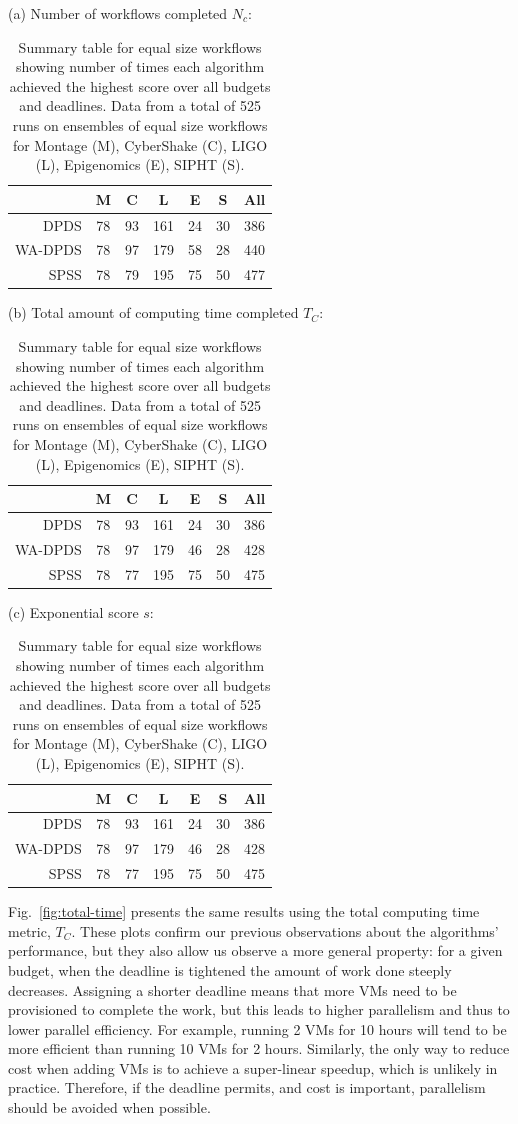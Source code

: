 \documentclass{sig-alternate}
\begin{document}
\begin{table}[tb]
\centering

(a) Number of workflows completed $N_c$:
\medskip
\begin{tabular}{r|cccccc}
 & M & C & L & E & S & All\tabularnewline
\hline
DPDS      &   78 &  93 & 161 &  24  & 30 & 386\tabularnewline
WA-DPDS   &    78  & 97 & 179  & 58  & 28 & 440\tabularnewline
SPSS     &    78  & 79 & 195 &  75 &  50 & 477\tabularnewline
\end{tabular}
\medskip

(b) Total amount of computing time completed $T_C$:
\medskip
\begin{tabular}{r|cccccc}
 & M & C & L & E & S & All\tabularnewline
\hline
DPDS      &   78 &  93 & 161 &  24 &  30 & 386\tabularnewline
WA-DPDS   &    78  & 97 & 179 &  46  & 28 & 428\tabularnewline
SPSS     &    78 &  77 & 195  & 75 &  50 & 475\tabularnewline
\end{tabular}
\medskip

(c) Exponential score $s$:
\medskip
\begin{tabular}{r|cccccc}
 & M & C & L & E & S & All\tabularnewline
\hline
DPDS      &   78  & 93 & 161 &  24 &  30 & 386\tabularnewline
WA-DPDS   &    78 &  97 & 179  & 46  & 28 & 428\tabularnewline
SPSS     &    78 &  77 & 195 &  75  & 50 & 475\tabularnewline
\end{tabular}
\medskip

\caption{Summary table for equal size workflows showing number of times each
algorithm achieved the highest score over all budgets and deadlines. Data from a total of 525 runs on 
ensembles of equal size workflows for Montage (M), CyberShake (C), LIGO (L), 
Epigenomics (E), SIPHT (S).
\label{tab:num-dags-equal}}
\end{table}

Fig.~\ref{fig:total-time} presents the same results using the total computing
time metric, $T_C$. These plots confirm our previous observations about the
algorithms' performance, but they also allow us observe a more general property:
for a given budget, when the deadline is tightened the amount of work done
steeply decreases. Assigning a shorter deadline means that more VMs need to be
provisioned to complete the work, but this leads to higher parallelism and thus
to lower parallel efficiency. For example, running 2 VMs for 10 hours will tend
to be more efficient than running 10 VMs for 2 hours. Similarly, the only way 
to reduce cost when adding VMs is to achieve a super-linear speedup, which 
is unlikely in practice. Therefore, if the deadline permits, and cost is 
important, parallelism should be avoided when possible.
\end{document}
